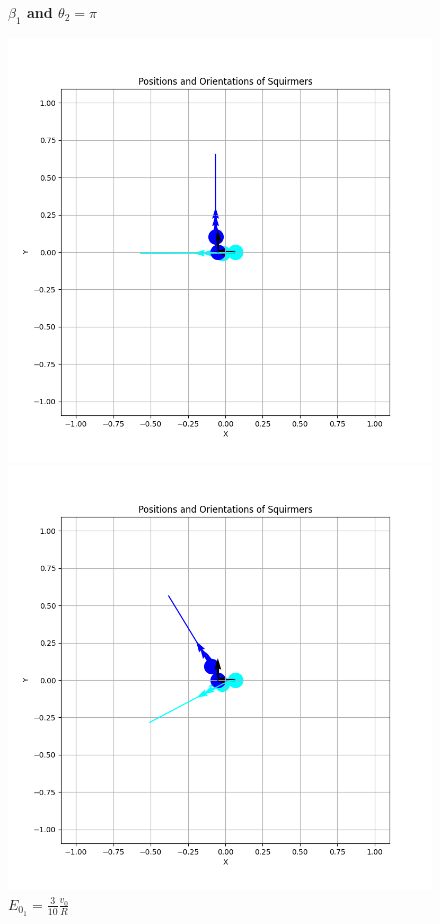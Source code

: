\documentclass{article}
\begin{document}
\begin{figure}[H]
    \centering
    \textbf{$\beta_1$ and $\theta_2 = \pi$}\par\medskip
    \begin{minipage}{0.49\textwidth}
        \includegraphics[width=1\textwidth]{graphs/Eo_analysis/beta0/pi_/pi_Eo_brumley.png}
        \caption{\footnotesize $E_{0_{2}}=\frac{8}{5}\mu\pi a^2$}
    \end{minipage}\hfill
    \begin{minipage}{0.49\textwidth}
        \includegraphics[width=1\textwidth]{graphs/Eo_analysis/beta0/pi_/pi_Eo_init.png}
        \caption{\footnotesize $E_{0_{1}}=\frac{3}{10}\frac{v_0}{R}$}
    \end{minipage}
\end{figure}
\end{document}
